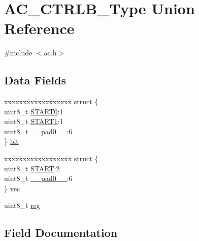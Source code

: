 \hypertarget{union_a_c___c_t_r_l_b___type}{}\section{A\+C\+\_\+\+C\+T\+R\+L\+B\+\_\+\+Type Union Reference}
\label{union_a_c___c_t_r_l_b___type}


{\ttfamily \#include $<$ac.\+h$>$}

\subsection*{Data Fields}
\begin{DoxyCompactItemize}
\item 
\begin{tabbing}
xx\=xx\=xx\=xx\=xx\=xx\=xx\=xx\=xx\=\kill
struct \{\\
\>uint8\_t \mbox{\hyperlink{union_a_c___c_t_r_l_b___type_a3394724a4f92f41dd2e3375dfd14e0ce}{START0}}:1\\
\>uint8\_t \mbox{\hyperlink{union_a_c___c_t_r_l_b___type_abd0c4b74d64ce7071cb929b2e0f5ac8a}{START1}}:1\\
\>uint8\_t \mbox{\hyperlink{union_a_c___c_t_r_l_b___type_a8b4eebe79ded0459acec2f4950102ba3}{\_\_pad0\_\_}}:6\\
\} \mbox{\hyperlink{union_a_c___c_t_r_l_b___type_adf199c6debc620e098a5b6577c370439}{bit}}\\

\end{tabbing}\item 
\begin{tabbing}
xx\=xx\=xx\=xx\=xx\=xx\=xx\=xx\=xx\=\kill
struct \{\\
\>uint8\_t \mbox{\hyperlink{union_a_c___c_t_r_l_b___type_acd48c87f8808fb311a0f7e2c6159bc59}{START}}:2\\
\>uint8\_t \mbox{\hyperlink{union_a_c___c_t_r_l_b___type_a8b4eebe79ded0459acec2f4950102ba3}{\_\_pad0\_\_}}:6\\
\} \mbox{\hyperlink{union_a_c___c_t_r_l_b___type_a9f5d16a6bb3b48b0c78f2ffc386649ad}{vec}}\\

\end{tabbing}\item 
uint8\+\_\+t \mbox{\hyperlink{union_a_c___c_t_r_l_b___type_a9428adc9af4653a2050e2536b55dec8d}{reg}}
\end{DoxyCompactItemize}


\subsection{Field Documentation}
\mbox{\label{union_a_c___c_t_r_l_b___type_a8b4eebe79ded0459acec2f4950102ba3}} 
